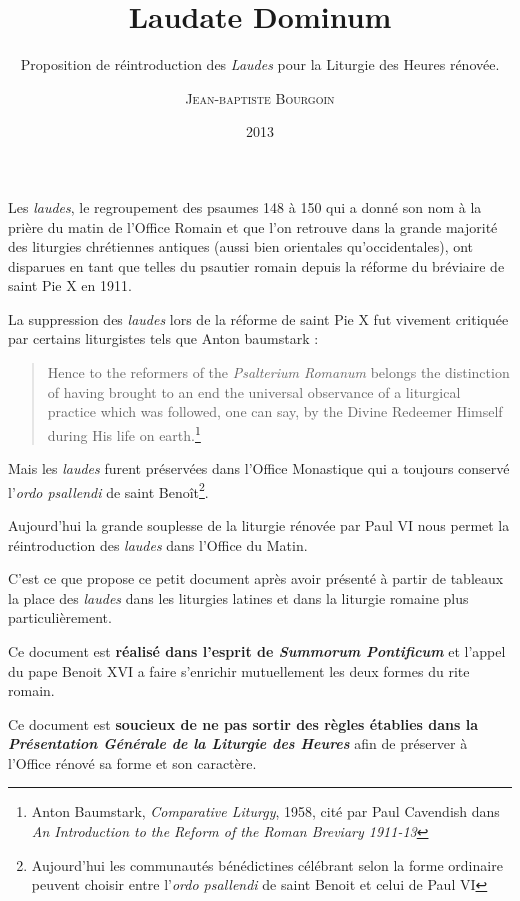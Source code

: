 \documentclass[oneside, 10pt]{article}
\title{Laudate Dominum}
\subtitle{Proposition de réintroduction des \emph{Laudes} pour la Liturgie des Heures rénovée.}
\author{\textsc{Jean-baptiste Bourgoin}}
\date{2013}
\begin{document}
\maketitle


\tableofcontents

\newpage
{}

Les \emph{laudes}, le regroupement des psaumes 148 à 150 qui a donné son nom à la prière du matin de l'Office Romain et que l'on retrouve dans la grande majorité des liturgies chrétiennes antiques (aussi bien orientales qu'occidentales), ont disparues en tant que telles du psautier romain depuis la réforme du bréviaire de saint Pie X en 1911.

La suppression des \emph{laudes} lors de la réforme de saint Pie X fut vivement critiquée par certains liturgistes tels que Anton baumstark :

\begin{quote}
Hence to the reformers of the \emph{Psalterium Romanum} belongs the distinction of having brought to an end the universal observance of a liturgical practice which was followed, one can say, by the Divine Redeemer Himself during His life on earth.\footnote{Anton Baumstark, \emph{Comparative Liturgy}, 1958, cité par Paul Cavendish dans \emph{An Introduction to the Reform of the Roman Breviary 1911-13}}
\end{quote}

Mais les \emph{laudes} furent préservées dans l'Office Monastique qui a toujours conservé l'\textit{ordo psallendi} de saint Benoît\footnote{Aujourd'hui les communautés bénédictines célébrant selon la forme ordinaire peuvent choisir entre l'\textit{ordo psallendi} de saint Benoit et celui de Paul VI}.

Aujourd'hui la grande souplesse de la liturgie rénovée par Paul VI nous permet la réintroduction des \emph{laudes} dans l'Office du Matin.

C'est ce que propose ce petit document après avoir présenté à partir de tableaux la place des \emph{laudes} dans les liturgies latines et dans la liturgie romaine plus particulièrement.

Ce document est \textbf{réalisé dans l'esprit de \textit{Summorum Pontificum}} et l'appel du pape Benoit XVI a faire s'enrichir mutuellement les deux formes du rite romain.

Ce document est \textbf{soucieux de ne pas sortir des règles établies dans la \textit{Présentation Générale de la Liturgie des Heures}} afin de préserver à l'Office rénové sa forme et son caractère.
\end{document}
